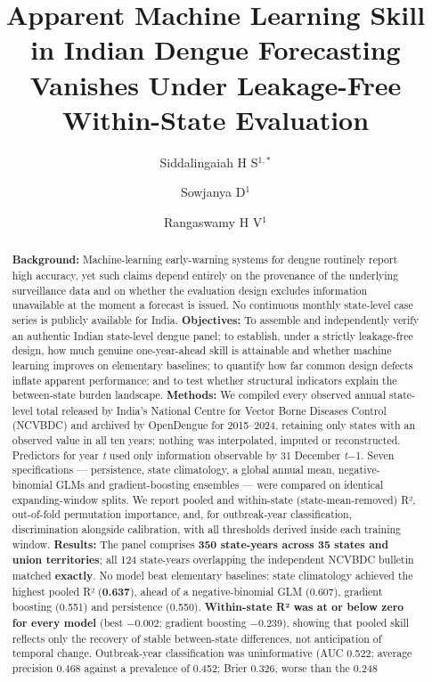\documentclass[
  10pt,
  twocolumn]{article}
\title{Apparent Machine Learning Skill in Indian Dengue Forecasting
Vanishes Under Leakage-Free Within-State Evaluation}
\author{Siddalingaiah H S\(^{1,*}\) \and Sowjanya
D\(^{1}\) \and Rangaswamy H V\(^{1}\)}
\date{}
\begin{document}
\maketitle
\begin{abstract}
\textbf{Background:} Machine-learning early-warning systems for dengue
routinely report high accuracy, yet such claims depend entirely on the
provenance of the underlying surveillance data and on whether the
evaluation design excludes information unavailable at the moment a
forecast is issued. No continuous monthly state-level case series is
publicly available for India. \textbf{Objectives:} To assemble and
independently verify an authentic Indian state-level dengue panel; to
establish, under a strictly leakage-free design, how much genuine
one-year-ahead skill is attainable and whether machine learning improves
on elementary baselines; to quantify how far common design defects
inflate apparent performance; and to test whether structural indicators
explain the between-state burden landscape. \textbf{Methods:} We
compiled every observed annual state-level total released by India's
National Centre for Vector Borne Diseases Control (NCVBDC) and archived
by OpenDengue for 2015--2024, retaining only states with an observed
value in all ten years; nothing was interpolated, imputed or
reconstructed. Predictors for year \emph{t} used only information
observable by 31 December \emph{t}−1. Seven specifications ---
persistence, state climatology, a global annual mean, negative-binomial
GLMs and gradient-boosting ensembles --- were compared on identical
expanding-window splits. We report pooled and within-state
(state-mean-removed) R², out-of-fold permutation importance, and, for
outbreak-year classification, discrimination alongside calibration, with
all thresholds derived inside each training window. \textbf{Results:}
The panel comprises \textbf{350 state-years across 35 states and union
territories}; all 124 state-years overlapping the independent NCVBDC
bulletin matched \textbf{exactly}. No model beat elementary baselines:
state climatology achieved the highest pooled R² (\textbf{0.637}), ahead
of a negative-binomial GLM (0.607), gradient boosting (0.551) and
persistence (0.550). \textbf{Within-state R² was at or below zero for
every model} (best −0.002; gradient boosting −0.239), showing that
pooled skill reflects only the recovery of stable between-state
differences, not anticipation of temporal change. Outbreak-year
classification was uninformative (AUC 0.522; average precision 0.468
against a prevalence of 0.452; Brier 0.326, worse than the 0.248

\end{abstract}
\end{document}

